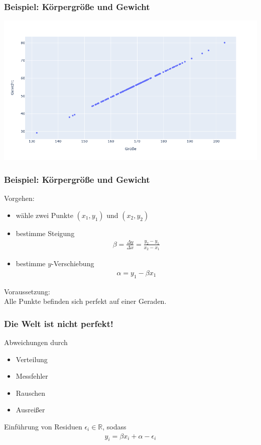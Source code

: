 
\begin{frame}
\frametitle{Beispiel: Körpergröße und Gewicht}

\begin{center}
	\includegraphics[width=\linewidth]{fig7/artifical.png}
\end{center}

\end{frame}


\begin{frame}
\frametitle{Beispiel: Körpergröße und Gewicht}

Vorgehen:
\begin{itemize}
	\item wähle zwei Punkte $(x_1, y_1)$ und $(x_2, y_2)$
	\item bestimme Steigung \begin{align*} \beta = \tfrac{\Delta y}{\Delta x} = \tfrac{y_2 - y_1}{x_2 - x_1} \end{align*}
	\item bestimme $y$-Verschiebung \begin{align*} \alpha = y_1 - \beta x_1 \end{align*}
\end{itemize}

Voraussetzung: \\ Alle Punkte befinden sich perfekt auf einer Geraden.

\end{frame}


\begin{frame}
\frametitle{Die Welt ist nicht perfekt!}

Abweichungen durch
\begin{itemize}
	\item Verteilung
	\item Messfehler
	\item Rauschen
	\item Ausreißer
\end{itemize}

Einführung von Residuen $\epsilon_i \in \mathbb{R}$, sodass
\begin{align*}
	y_i = \beta x_i + \alpha - \epsilon_i
\end{align*}

\end{frame}

